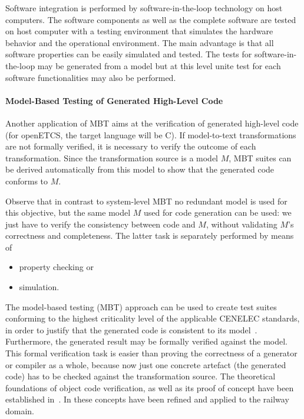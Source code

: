 Software integration is performed by software-in-the-loop technology
on host computers. The software components as well as the complete
software are tested on host computer with a testing environment that
simulates the hardware behavior and the operational environment. The
main advantage is that all software properties can be easily simulated
and tested. The tests for software-in-the-loop may be generated from a
model but at this level unite test for each software functionalities
may also be performed.

\paragraph{Model-Based Testing of Generated High-Level Code}
Another application of MBT aims at the verification of generated
high-level code (for openETCS, the target language will be C).  If
model-to-text transformations are not formally verified, it is
necessary to verify the outcome of each transformation. Since the
transformation source is a model $M$, MBT suites can be derived
automatically from this model to show that the generated code conforms
to $M$.

Observe that in contrast to system-level MBT no redundant model is
used for this objective, but the same model $M$ used for code
generation can be used: we just have to verify the consistency between
code and $M$, without validating $M$'s correctness and
completeness. The latter task is separately performed by means of
\begin{itemize}
\item property checking or
\item simulation.
\end{itemize}
The model-based testing (MBT) approach can be used to create test
suites conforming to the highest criticality level of the applicable
CENELEC standards, in order to justify that the generated code is
consistent to its model~\cite{PeleskaVL11Nfm,pel2011a,peleska2009d}.
Furthermore, the generated result may be formally verified against the
model. This formal verification task is easier than proving the
correctness of a generator or compiler as a whole, because now just
one concrete artefact (the generated code) has to be checked against
the transformation source. The theoretical foundations of object code
verification, as well as its proof of concept have been established
in~\cite{Pnueli98}. In
\cite{RSRSChapter2012,DBLP:journals/fac/HaxthausenPK11} these concepts
have been refined and applied to the railway domain.


